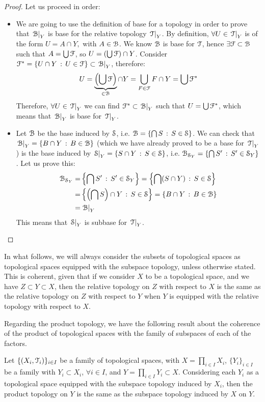 \begin{proof}
	Let us proceed in order:
	\begin{itemize}
	\item We are going to use the definition of base for a topology in order to prove that $\Rel{\B}{Y}$  is base for the relative topology $\Trel{Y}$. By definition, $\forall U\in\Trel{Y}$ is of the form $U = A\cap Y,$ with $A\in\B$. We know $\B$ is base for $\T$, hence $\exists \F\subset \B$ such that $A=\bigcup \F$, so $U=(\bigcup \F)\cap Y$. Consider $\F^*=\setdef{U\cap Y}{U\in\F}\subset\Rel{\B}{Y}$, therefore:
	$$
	  U=\underbrace{\left(\bigcup \F\right)}_{\in\B}\cap Y=\bigcup_{F\in \F}F\cap Y=\bigcup \F^*
	$$
	Therefore, $\forall U\in\Trel{Y}$ we can find $\F^*\subset \Rel{\B}{Y}$ such that $U=\bigcup \F^*$, which means that $\Rel{\B}{Y}$ is base for $\Trel{Y}$.
	\item Let $\B$ be the base induced by $\S$, i.e. $\B=\setdef{\bigcap S}{S\in\S}$. We can check that $\Rel{\B}{Y} = \setdef{B\cap Y}{B\in\B}$ (which we have already proved to be a base for $\Trel{Y}$) is the base induced by $\Rel{\S}{Y} =\setdef{S\cap Y}{S\in\S}$, i.e. $\B_{\S_Y}=\setdef{\bigcap S'}{S'\in\S_Y}$. Let us prove this:
		\begin{align*}
		\B_{\S_Y}=&\setdef{\bigcap S'}{S'\in\S_Y}=\setdef{\bigcap (S\cap Y)}{S\in\S}\\
		=&\setdef{\left(\bigcap S\right)\cap Y}{S\in\S}=\setdef{B\cap Y}{B\in\B}\\
		=&\Rel{\B}{Y}
		\end{align*}
	This means that $\Rel{\S}{Y}$ is subbase for $\Trel{Y}$.
	\end{itemize}
\end{proof}

In what follows, we will always consider the subsets of topological spaces as topological spaces equipped with the subspace topology, unless otherwise stated.
This is coherent, given that if we consider $X$ to be a topological space, and we have $Z\subset Y\subset X$, then the relative topology on $Z$ with respect to $X$ is the same as the relative topology on $Z$ with respect to $Y$ when $Y$ is equipped with the relative topology with respect to $X$.

Regarding the product topology, we have the following result about the coherence of the product of topological spaces with the family of subspaces of each of the factors.

\begin{theorem}
	\label{th:product-subspace-topology}
	Let $\{(X_i, \T_i)\}_{i\in I}$ be a family of topological spaces, with $X=\prod_{i\in I} X_i$,
	$\{Y_i\}_{i\in I}$ be a family with $Y_i\subset X_i$, $\forall i\in I$, and $Y=\prod_{i\in I}Y_i\subset X$.
	Considering each $Y_i$ as a topological space equipped with the subspace topology
	induced by $X_i$, then the product topology on $Y$ is the same as the subspace topology induced by $X$ on $Y$.
\end{theorem}


